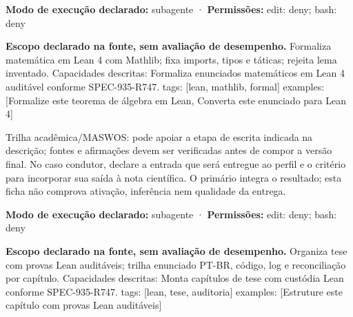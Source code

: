 \begin{arquitetura}
\textbf{Modo de execução declarado:} subagente · \textbf{Permissões:} edit: deny; bash: deny
\end{arquitetura}


\begin{descricao}
\textbf{Escopo declarado na fonte, sem avaliação de desempenho.}
Formaliza matemática em Lean 4 com Mathlib; fixa imports, tipos e táticas; rejeita lema inventado. Capacidades descritas: Formaliza enunciados matemáticos em Lean 4 auditável conforme SPEC-935-R747. tags: [lean, mathlib, formal] examples: [Formalize este teorema de álgebra em Lean, Converta este enunciado para Lean 4]
\end{descricao}

\begin{funcao}
Trilha acadêmica/MASWOS: pode apoiar a etapa de escrita indicada na descrição; fontes e afirmações devem ser verificadas antes de compor a versão final. No caso condutor, declare a entrada que será entregue ao perfil e o critério para incorporar sua saída à nota científica. O primário integra o resultado; esta ficha não comprova ativação, inferência nem qualidade da entrega.
\end{funcao}

\begin{arquitetura}
\textbf{Modo de execução declarado:} subagente · \textbf{Permissões:} edit: deny; bash: deny
\end{arquitetura}


\begin{descricao}
\textbf{Escopo declarado na fonte, sem avaliação de desempenho.}
Organiza tese com provas Lean auditáveis; trilha enunciado PT-BR, código, log e reconciliação por capítulo. Capacidades descritas: Monta capítulos de tese com custódia Lean conforme SPEC-935-R747. tags: [lean, tese, auditoria] examples: [Estruture este capítulo com provas Lean auditáveis]
\end{descricao}


